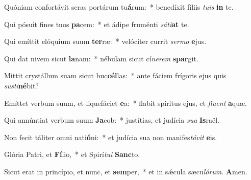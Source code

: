 \setcounter{versecount}{2}

\vs Quóniam confortávit seras portárum tu\textbf{á}rum:~* benedíxit fíliis \textit{tu}\textit{is} \textbf{in} te.

\vs Qui pósuit fines tuos \textbf{pa}cem:~* et ádipe fruménti \textit{sá}\textit{ti}\textbf{at} te.

\vs Qui emíttit elóquium suum \textbf{ter}ræ:~* velóciter currit \textit{ser}\textit{mo} \textbf{e}jus.

\vs Qui dat nivem sicut \textbf{la}nam:~* nébulam sicut cí\textit{ne}\textit{rem} \textbf{spar}git.

\vs Mittit crystállum suam sicut buc\textbf{cél}las:~* ante fáciem frígoris ejus quis \textit{sus}\textit{ti}\textbf{né}bit?

\vs Emíttet verbum suum, et liquefáciet \textbf{e}a:~* flabit spíritus ejus, et \textit{flu}\textit{ent} \textbf{a}quæ.

\vs Qui annúntiat verbum suum \textbf{Ja}cob:~* justítias, et judícia \textit{su}\textit{a} \textbf{Is}raël.

\vs Non fecit táliter omni nati\textbf{ó}ni:~* et judícia sua non manifes\textit{tá}\textit{vit} \textbf{e}is.

\vs Glória Patri, et \textbf{Fí}lio,~* et Spirí\textit{tu}\textit{i} \textbf{Sanc}to.

\vs Sicut erat in princípio, et nunc, et \textbf{sem}per,~* et in sǽcula sæcu\textit{ló}\textit{rum}. \textbf{A}men.

